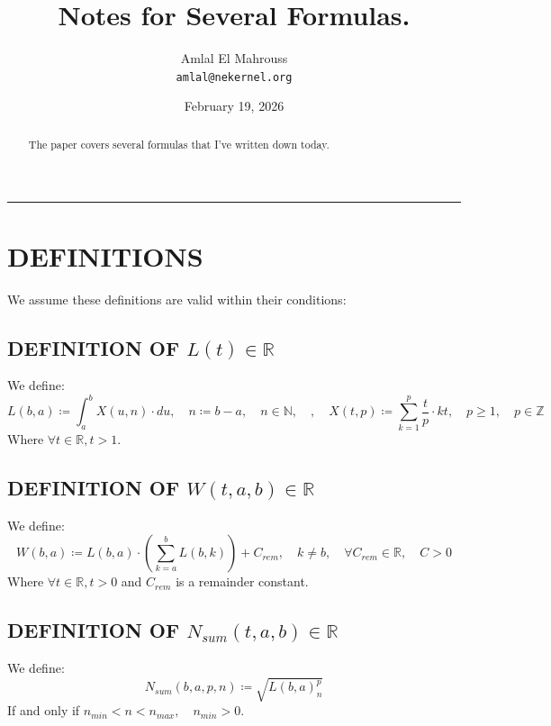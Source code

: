 \documentclass[11pt, a4paper]{article}
\title{Notes for Several Formulas.}
\author{Amlal El Mahrouss\\\texttt{amlal@nekernel.org}}
\date{February 19, 2026}
\begin{document}
\maketitle

\begin{center}
	\rule[0.01cm]{17cm}{0.01cm}
\end{center}

\begin{abstract}
\begin{center}
    The paper covers several formulas that I've written down today.
\end{center}
\end{abstract}

\section{DEFINITIONS}

We assume these definitions are valid within their conditions:

\subsection{DEFINITION OF $L(t) \in \mathbb{R}$}
We define:
\begin{equation}
    L(b, a) \coloneqq \int_{a}^{b}X(u, n)\cdot du, \quad n \coloneqq b - a, \quad n \in \mathbb{N}, \quad, \quad X(t, p) \coloneqq \sum_{k=1}^{p}\frac{t}{p}\cdot kt, \quad p \geq 1, \quad p \in \mathbb{Z}
\end{equation}
Where $\forall t \in \mathbb{R}, t > 1$.

\subsection{DEFINITION OF $W(t, a, b) \in \mathbb{R}$}
We define:
\begin{equation}
    W(b, a) \coloneqq L(b, a)\cdot(\sum_{k=a}^{b} L(b, k)) +C_{rem}, \quad k \neq b,\quad \forall C_{rem} \in \mathbb{R}, \quad C > 0
\end{equation}
Where $\forall t \in \mathbb{R}, t > 0$ and $C_{rem}$ is a remainder constant.

\subsection{DEFINITION OF $N_{sum}(t, a, b) \in \mathbb{R}$}

We define:
\begin{equation}
    N_{sum}(b, a, p, n) \coloneqq \sqrt{L(b, a)^p_{n}}
\end{equation}
If and only if $n_{min} < n < n_{max}, \quad n_{min} > 0$.
\end{document}
